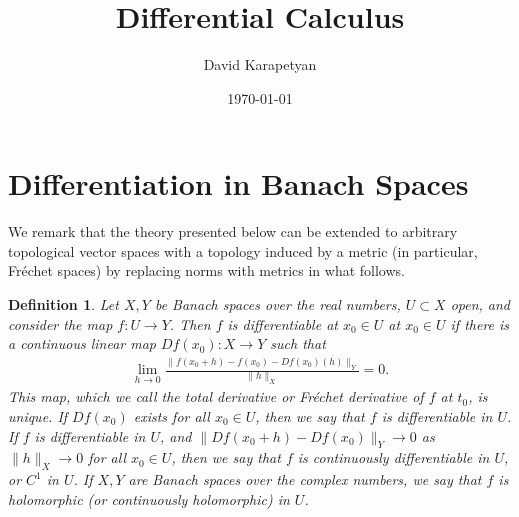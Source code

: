 \documentclass[12pt,reqno]{amsart}
\numberwithin{equation}{section}  %
\newtheorem{definition}[theorem]{Definition}
\begin{document}
\title{Differential Calculus}
\author{David Karapetyan}
\address{Department of Mathematics  \
University  of Notre Dame\
Notre Dame, IN 46556 }
\date{\today}
%
\maketitle
%
%
\section{Differentiation in Banach Spaces}
We remark that the theory presented below can be extended to arbitrary
topological vector spaces with a topology induced by a metric (in particular,
Fr\'echet spaces) by replacing norms with metrics in what follows.
\begin{definition}
\label{def:diff}
Let $X,Y$ be Banach spaces over the real numbers, $U \subset X$ open,
and consider the map $f: U \to Y$.
Then $f$ is differentiable at $x_0 \in U$ at $x_{0} \in U$ if there
is a continuous linear map $Df(x_0): X \to Y$ such that
%
%
%
%
\begin{equation}
\label{diff-limit}
\begin{split}
\lim_{h \to 0} \frac{\|f(x_0+ h) - f(x_0) -
Df(x_0)(h) \|_Y}{\|h\|_{X}} = 0.
\end{split}
\end{equation}
%
%
This map, which we call the \emph{total derivative} or \emph{Fr\'echet derivative} of $f$ at $t_0$, is 
unique. If $Df(x_0)$ exists for all $x_0 \in U$,
then we say that $f$ is
\emph{differentiable} in $U$. If $f$ is differentiable in $U$, and 
$\|Df(x_0 + h) - Df(x_0) \|_Y \to 0$ as $\|h\|_{X} \to 0$ for all $x_0 \in U$,
then we say that $f$ is \emph{continuously differentiable in $U$}, or $C^{1}$ in $U$. If $X, Y$
are Banach spaces over the complex numbers, we say that $f$ is
\emph{holomorphic} (or \emph{continuously holomorphic}) in $U$.
\end{definition}
%
%
%
\end{document}

